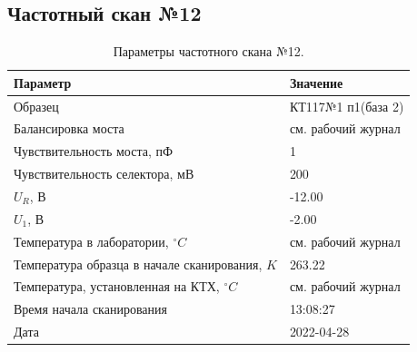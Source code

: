 \subsection{Частотный скан №12}
\begin{table}[!ht]
    \centering
    \caption{Параметры частотного скана №12.}
    \begin{tabular}{|l|l|}
        \hline
        Параметр                                       & Значение                  \\ \hline
        Образец                                        & КТ117№1 п1(база 2)        \\ \hline
        Балансировка моста                             & см. рабочий журнал        \\ \hline
        Чувствительность моста, пФ                     & 1                         \\ \hline
        Чувствительность селектора, мВ                 & 200                       \\ \hline
        $U_R$, В                                       & -12.00                    \\ \hline
        $U_1$, В                                       & -2.00                     \\ \hline
        Температура в лаборатории, $^\circ C$          & см. рабочий журнал        \\ \hline
        Температура образца в начале сканирования, $K$ & 263.22                    \\ \hline
        Температура, установленная на КТХ, $^\circ C$  & см. рабочий журнал        \\ \hline
        Время начала сканирования                      & 13:08:27                  \\ \hline
        Дата                                           & 2022-04-28                \\ \hline
    \end{tabular}
    \label{table:frequency_scan_12}
\end{table}


